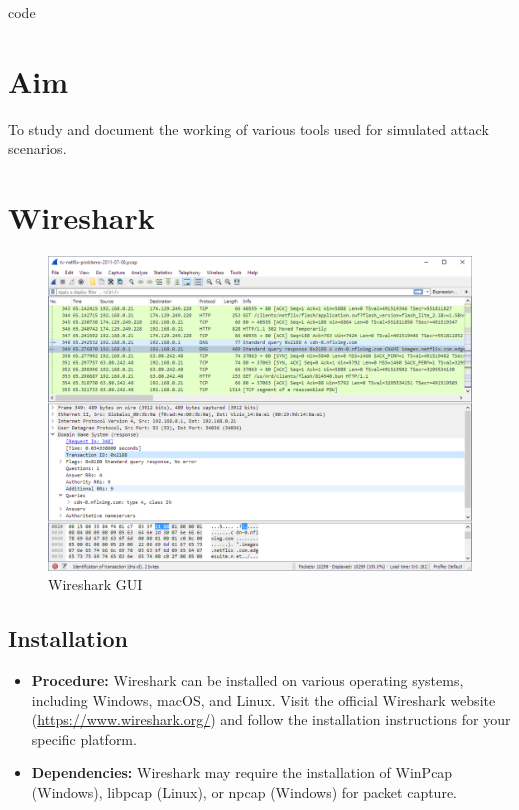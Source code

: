 code \documentclass[11pt]{article}
\begin{document}
\tableofcontents
\thispagestyle{empty}
\clearpage

\setcounter{page}{1}

\section{Aim}
To study and document the working of various tools used for simulated attack scenarios.

\section{Wireshark}

\begin{figure}[H]
	\centering
	\includegraphics[width=.95\textwidth]{img/wireshark/wireshark_0.jpg}
	\caption{Wireshark GUI}
\end{figure}

\subsection{Installation}
\begin{itemize}
	\item \textbf{Procedure:} Wireshark can be installed on various operating systems, including Windows, macOS, and Linux. Visit the official Wireshark website (\url{https://www.wireshark.org/}) and follow the installation instructions for your specific platform.
	\item \textbf{Dependencies:} Wireshark may require the installation of WinPcap (Windows), libpcap (Linux), or npcap (Windows) for packet capture.
\end{itemize}
\end{document}
